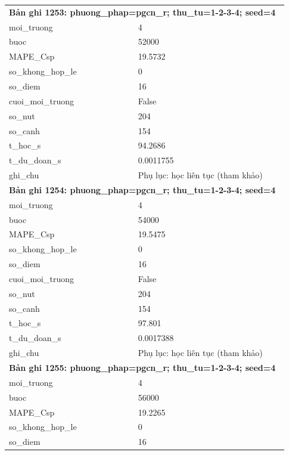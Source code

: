 \begin{longtable}{p{0.43\linewidth}p{0.50\linewidth}}
\midrule
\multicolumn{2}{p{0.95\linewidth}}{\textbf{Bản ghi 1253: phuong\_phap=pgcn\_r; thu\_tu=1-2-3-4; seed=4}} \\
moi\_\allowbreak truong & 4 \\
buoc & 52000 \\
MAPE\_\allowbreak Csp & 19.5732 \\
so\_\allowbreak khong\_\allowbreak hop\_\allowbreak le & 0 \\
so\_\allowbreak diem & 16 \\
cuoi\_\allowbreak moi\_\allowbreak truong & False \\
so\_\allowbreak nut & 204 \\
so\_\allowbreak canh & 154 \\
t\_\allowbreak hoc\_\allowbreak s & 94.2686 \\
t\_\allowbreak du\_\allowbreak doan\_\allowbreak s & 0.0011755 \\
ghi\_\allowbreak chu & Phụ lục: học liên tục (tham khảo) \\
\midrule
\multicolumn{2}{p{0.95\linewidth}}{\textbf{Bản ghi 1254: phuong\_phap=pgcn\_r; thu\_tu=1-2-3-4; seed=4}} \\
moi\_\allowbreak truong & 4 \\
buoc & 54000 \\
MAPE\_\allowbreak Csp & 19.5475 \\
so\_\allowbreak khong\_\allowbreak hop\_\allowbreak le & 0 \\
so\_\allowbreak diem & 16 \\
cuoi\_\allowbreak moi\_\allowbreak truong & False \\
so\_\allowbreak nut & 204 \\
so\_\allowbreak canh & 154 \\
t\_\allowbreak hoc\_\allowbreak s & 97.801 \\
t\_\allowbreak du\_\allowbreak doan\_\allowbreak s & 0.0017388 \\
ghi\_\allowbreak chu & Phụ lục: học liên tục (tham khảo) \\
\midrule
\multicolumn{2}{p{0.95\linewidth}}{\textbf{Bản ghi 1255: phuong\_phap=pgcn\_r; thu\_tu=1-2-3-4; seed=4}} \\
moi\_\allowbreak truong & 4 \\
buoc & 56000 \\
MAPE\_\allowbreak Csp & 19.2265 \\
so\_\allowbreak khong\_\allowbreak hop\_\allowbreak le & 0 \\
so\_\allowbreak diem & 16 \\

\end{longtable}
